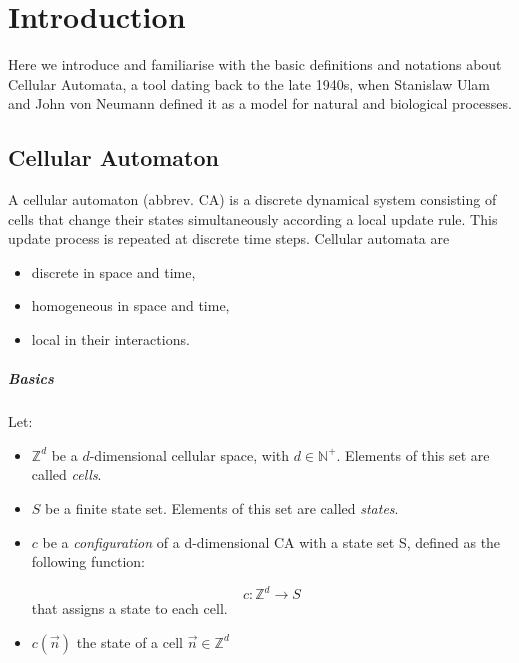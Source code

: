 \chapter{Introduction}

Here we introduce and familiarise with the basic definitions and notations about Cellular Automata, a tool dating back to the late 1940s, when Stanislaw Ulam and John von Neumann defined it as a model for natural and biological processes.

\section{Cellular Automaton}
\label{ca}

A cellular automaton (abbrev. CA) is a discrete dynamical system consisting of cells that change their states simultaneously according a local update rule. This update process is repeated at discrete time steps.
Cellular automata are\cite{canotes}

\begin{itemize}
	\item discrete in space and time,
	\item homogeneous in space and time,
	\item local in their interactions.
\end{itemize}


\paragraph{Basics}

Let:

\begin{itemize}

	\item $\mathds{Z}^{d}$ be a $d$-dimensional cellular space, with $d \in \mathds{N}^{+}$. Elements of this set are called \textit{cells}.

	\item $S$ be a finite state set. Elements of this set are called \textit{states}.

	\item $c$ be a \textit{configuration} of a d-dimensional CA with a state set S, defined as the following function:

	$$c: \mathds{Z}^d \rightarrow S$$
	that assigns a state to each cell.

	\item $c(\vec{n })$ the state of a cell $\vec{n} \in \mathds{Z}^d$

\end{itemize}

